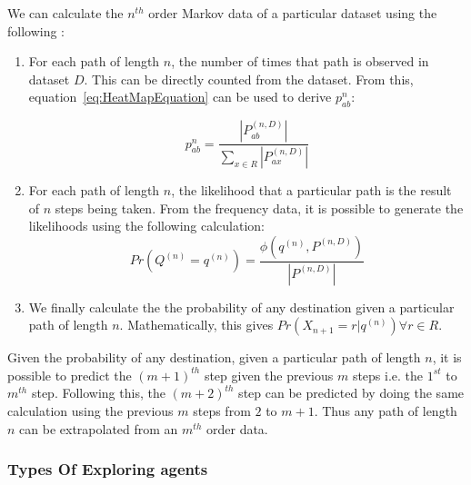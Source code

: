 We can calculate the $n^{th}$ order Markov data of a particular dataset using the following :
\begin{enumerate}
    \item For each path of length $n$, the number of times that path is observed in dataset $D$. This can be directly counted from the dataset. From this, equation~\ref{eq:HeatMapEquation} can be used to derive $p^{n}_{ab}$:

    \begin{equation}
        p^{n}_{ab} = \frac{\left\vert{P^{(n,D)}_{ab}}\right\vert}{\sum\limits_{x\in R}\left\vert{P^{(n,D)}_{ax}}\right\vert}
        \label{eq:HeatMapEquation}
    \end{equation}

    \item For each path of length $n$, the likelihood that a particular path is the result of $n$ steps being taken.
    From the frequency data, it is possible to generate the likelihoods using the following calculation:
    \begin{equation}
        Pr(Q^{(n)}=q^{(n)}) = \frac{\phi(q^{(n)},P^{(n,D)})}{\left\vert{P^{(n,D)}}\right\vert}
        \label{eq:TableEquation}
    \end{equation}


    \item We finally calculate the the probability of any destination given a particular path of length $n$. Mathematically, this gives $Pr(X_{n+1}=r|q^{(n)}) \forall r \in R$.

\end{enumerate}


Given the probability of any destination, given a particular path of length $n$, it is possible to predict the $(m+1)^{th}$ step given the previous $m$ steps i.e. the $1^{st}$ to $m^{th}$ step. Following this, the $(m+2)^{th}$ step can be predicted by doing the same calculation using the previous $m$ steps from $2$ to $m+1$. Thus any path of length $n$ can be extrapolated from an $m^{th}$ order data.



\subsubsection{Types Of Exploring agents}
\label{sec:types_of_data}

